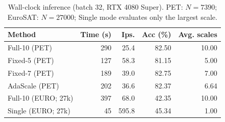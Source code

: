 \begin{table}[t]
\centering
\caption{Wall-clock inference (batch 32, RTX 4080 Super). PET: $N{=}7390$; EuroSAT: $N{=}27000$; Single mode evaluates only the largest scale.}
\label{tab:runtime}
\small
\setlength{\tabcolsep}{4pt}
\begin{tabular}{lrrrr}
\hline
Method & Time (s) & Ips. & Acc (\%) & Avg. scales \\
\hline
Full-10 (PET) & 290 & 25.4 & 82.50 & 10.00 \\
Fixed-5 (PET) & 127 & 58.3 & 81.15 & 5.00 \\
Fixed-7 (PET) & 189 & 39.0 & 82.75 & 7.00 \\
AdaScale (PET) & 202 & 36.6 & 82.37 & 6.64 \\
Full-10 (EURO; 27k) & 397 & 68.0 & 42.35 & 10.00 \\
Single (EURO; 27k) & 45 & 595.8 & 45.34 & 1.00 \\
\hline
\end{tabular}
\end{table}

